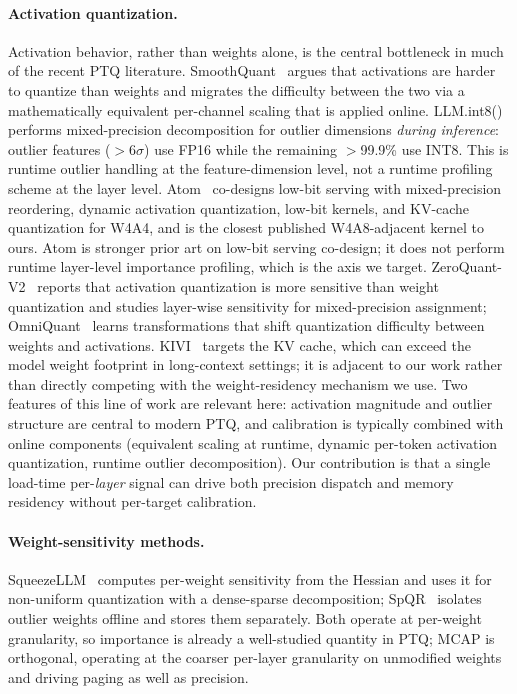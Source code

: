 \documentclass{article}
\begin{document}
\paragraph{Activation quantization.} Activation behavior, rather than weights
alone, is the central bottleneck in much of the recent PTQ literature.
SmoothQuant~\cite{xiao2022smoothquant} argues that activations are harder to
quantize than weights and migrates the difficulty between the two via a
mathematically equivalent per-channel scaling that is applied online.
LLM.int8()~\cite{dettmers2022llm} performs mixed-precision decomposition
for outlier dimensions \emph{during inference}: outlier features
($>$6$\sigma$) use FP16 while the remaining $>$99.9\% use INT8. This is
runtime outlier handling at the feature-dimension level, not a runtime
profiling scheme at the layer level. Atom~\cite{zhao2024atom} co-designs
low-bit serving with mixed-precision reordering, dynamic activation
quantization, low-bit kernels, and KV-cache quantization for W4A4, and
is the closest published W4A8-adjacent kernel to ours. Atom is stronger
prior art on low-bit serving co-design; it does not perform runtime
layer-level importance profiling, which is the axis we target.
ZeroQuant-V2~\cite{yao2023zeroquantv2} reports that activation quantization
is more sensitive than weight quantization and studies layer-wise sensitivity
for mixed-precision assignment; OmniQuant~\cite{shao2024omniquant} learns
transformations that shift quantization difficulty between weights and
activations. KIVI~\cite{liu2024kivi} targets the KV cache, which can exceed the model
weight footprint in long-context settings; it is adjacent to our work
rather than directly competing with the weight-residency mechanism we use. Two features of this line of work are relevant here: activation magnitude
and outlier structure are central to modern PTQ, and calibration is
typically combined with online components (equivalent scaling at runtime,
dynamic per-token activation quantization, runtime outlier
decomposition). Our contribution is that a single load-time
per-\emph{layer} signal can drive both precision dispatch and memory
residency without per-target calibration.

\paragraph{Weight-sensitivity methods.} SqueezeLLM~\cite{kim2024squeezellm} computes
per-weight sensitivity from the Hessian and uses it for non-uniform quantization with a
dense-sparse decomposition; SpQR~\cite{dettmers2024spqr} isolates outlier
weights offline and stores them separately. Both operate at per-weight
granularity, so importance is already a well-studied quantity in PTQ; MCAP
is orthogonal, operating at the coarser per-layer granularity on unmodified
weights and driving paging as well as precision.
\end{document}
